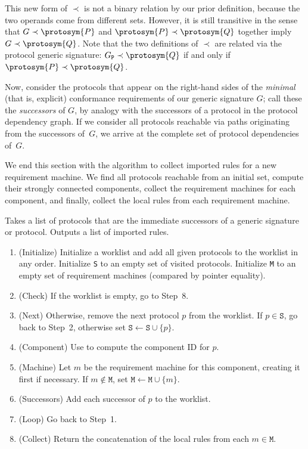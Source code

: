 \documentclass[../generics]{subfiles}
\begin{document}
This new form of $\prec$ is not a binary relation by our prior definition, because the two operands come from different sets. However, it is still transitive in the sense that $G\prec\protosym{P}$ and $\protosym{P}\prec\protosym{Q}$ together imply $G\prec\protosym{Q}$. Note that the two definitions of $\prec$ are related via the protocol generic signature: $G_\texttt{P}\prec\protosym{Q}$ if and only if $\protosym{P}\prec\protosym{Q}$.

Now, consider the protocols that appear on the right-hand sides of the \emph{minimal} (that is, explicit) conformance requirements of our generic signature $G$; call these the \emph{successors} of $G$, by analogy with the successors of a protocol in the protocol dependency graph. If we consider all protocols reachable via paths originating from the successors of~$G$, we arrive at the complete set of protocol dependencies of~$G$.

We end this section with the algorithm to collect imported rules for a new requirement machine. We find all protocols reachable from an initial set, compute their strongly connected components, collect the requirement machines for each component, and finally, collect the local rules from each requirement machine.
\begin{algorithm}\label{importing rules}
Takes a list of protocols that are the immediate successors of a generic signature or protocol. Outputs a list of imported rules.
\begin{enumerate}
\item (Initialize) Initialize a worklist and add all given protocols to the worklist in any order. Initialize \texttt{S} to an empty set of visited protocols. Initialize \texttt{M} to an empty set of requirement machines (compared by pointer equality).
\item (Check) If the worklist is empty, go to Step~8.
\item (Next) Otherwise, remove the next protocol $p$ from the worklist. If $p\in\texttt{S}$, go back to Step~2, otherwise set $\texttt{S}\leftarrow\texttt{S}\cup\{p\}$.
\item (Component) Use  to compute the component ID for $p$.
\item (Machine) Let $m$ be the requirement machine for this component, creating it first if necessary. If $m\notin\texttt{M}$, set $\texttt{M}\leftarrow\texttt{M}\cup\{m\}$.
\item (Successors) Add each successor of $p$ to the worklist.
\item (Loop) Go back to Step~1.
\item (Collect) Return the concatenation of the local rules from each $m\in\texttt{M}$.
\end{enumerate}
\end{algorithm}
\end{document}
